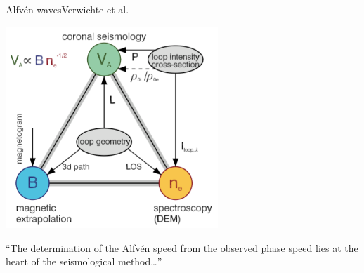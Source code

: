 \documentclass[11pt,table]{beamer}
\begin{document}
\begin{frame}[t]{Alfv\'en waves}{Verwichte et al.}
    \begin{block}{}
        \centering
        \vspace{-2em}
        \includegraphics[width=0.6\textwidth]{tor2.png}
    \end{block}
    ``The determination of the Alfv\'en speed from the observed phase
    speed lies at the heart of the seismological method\ldots''
\end{frame}%
\end{document}

